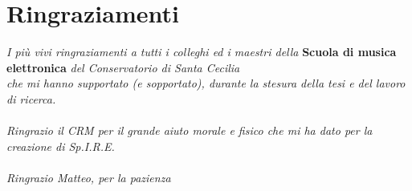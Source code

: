 

\chapter*{Ringraziamenti}

\textit{I più vivi ringraziamenti a tutti i colleghi ed i maestri della} \textbf{Scuola di musica elettronica} \textit{del Conservatorio di Santa Cecilia \\ che mi hanno supportato (e sopportato), durante la stesura della tesi e del lavoro di ricerca.}
\\
\\
\textit{Ringrazio il CRM per il grande aiuto morale e fisico che mi ha dato per la creazione di Sp.I.R.E.}
\\
\\
\textit{Ringrazio Matteo, per la pazienza}
